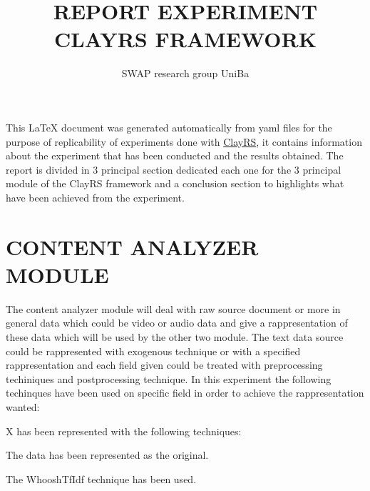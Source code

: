 \documentclass[11pt]{article}
\title{REPORT EXPERIMENT CLAYRS FRAMEWORK}
\author{SWAP research group UniBa}
\begin{document}
\maketitle
This \LaTeX{} document was generated automatically from yaml files for the purpose of replicability of experiments done with
\href{https://github.com/swapUniba/ClayRS}{ClayRS},
it contains information about the experiment that has been conducted and the results obtained.
The report is divided in 3 principal section dedicated each one for the 3 principal module of the ClayRS framework
and a conclusion section to highlights what have been achieved from the experiment.
\hfill\break
\hfill\break

\section{CONTENT ANALYZER MODULE}\label{sec:ca}
The content analyzer module will deal with raw source document or more in general data which could be
video or audio data and give a rappresentation of these data which will be used by the other two module.
The text data source could be rappresented with exogenous technique or with a specified rappresentation
and each field given could be treated with preprocessing techiniques and postprocessing technique. In
this experiment the following techinques have been used on specific field in order to achieve the
rappresentation wanted:
\hfill\break
\hfill\break

X has been represented with the following techniques:
\hfill\break
\hfill\break

The data has been represented as the original.
\hfill\break
\hfill\break
{}

The WhooshTfIdf technique has been used.
\hfill\break
\hfill\break
{}
\end{document}
